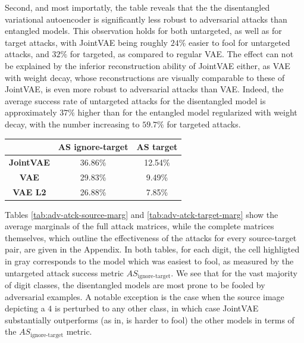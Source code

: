 \documentclass{report}
\begin{document}
\noindent Second, and most importatly, the table reveals that the the disentangled variational autoencoder is significantly less robust to adversarial attacks than entangled models. This observation holds for both untargeted, as well as for target attacks, with JointVAE being roughly $24\%$ easier to fool for untargeted attacks, and $32\%$ for targeted, as compared to regular VAE. The effect can not be explained by the inferior reconstruction ability of JointVAE either, as VAE with weight decay, whose reconstructions are visually comparable to these of JointVAE, is even more robust to adversarial attacks than VAE. Indeed, the average success rate of untargeted attacks for the disentangled model is approximately $37\%$ higher than for the entangled model regularized with weight decay, with the number increasing to $59.7\%$ for targeted attacks. \\

\begin{center}
  \begin{tabular}{|c|c|c|}
  \hline
   & \textbf{AS ignore-target} & \textbf{AS target} \\ \hline
  \textbf{JointVAE} & 36.86\% & 12.54\% \\ \hline
  \textbf{VAE} & 29.83\% & 9.49\% \\ \hline
  \textbf{VAE L2} & 26.88\% & 7.85\% \\ \hline
  \end{tabular}
\label{tab:mean-as}
\end{center}

\noindent Tables \ref{tab:adv-atck-source-marg} and \ref{tab:adv-atck-target-marg} show the average marginals of the full attack matrices, while the complete matrices themselves, which outline the effectiveness of the attacks for every source-target pair, are given in the Appendix. In both tables, for each digit, the cell highligted in gray corresponds to the model which was easiest to fool, as measured by the untargeted attack success metric $AS_\text{ignore-target}$. We see that for the vast majority of digit classes, the disentangled models are most prone to be fooled by adversarial examples. A notable exception is the case when the source image depicting a $4$ is perturbed to any other class, in which case JointVAE substantially outperforms (as in, is harder to fool) the other models in terms of the $AS_{\text{ignore-target}}$ metric. \\
\end{document}
